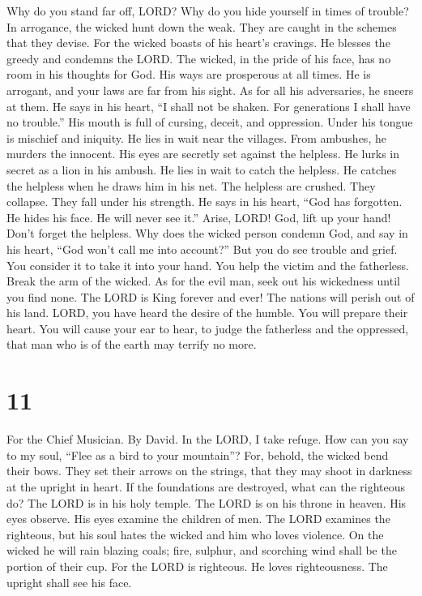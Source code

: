  Why do you stand far off, LORD? Why do you hide yourself
in times of trouble?  In arrogance, the wicked hunt down
the weak. They are caught in the schemes that they devise.
 For the wicked boasts of his heart's cravings. He blesses
the greedy and condemns the LORD.  The wicked, in the
pride of his face, has no room in his thoughts for God. 
His ways are prosperous at all times. He is arrogant, and your laws are
far from his sight. As for all his adversaries, he sneers at them.
 He says in his heart, ``I shall not be shaken. For
generations I shall have no trouble.''  His mouth is full
of cursing, deceit, and oppression. Under his tongue is mischief and
iniquity.  He lies in wait near the villages. From
ambushes, he murders the innocent. His eyes are secretly set against the
helpless.  He lurks in secret as a lion in his ambush. He
lies in wait to catch the helpless. He catches the helpless when he
draws him in his net.  The helpless are crushed. They
collapse. They fall under his strength.  He says in his
heart, ``God has forgotten. He hides his face. He will never see it.''
 Arise, LORD! God, lift up your hand! Don't forget the
helpless.  Why does the wicked person condemn God, and
say in his heart, ``God won't call me into account?'' 
But you do see trouble and grief. You consider it to take it into your
hand. You help the victim and the fatherless.  Break the
arm of the wicked. As for the evil man, seek out his wickedness until
you find none.  The LORD is King forever and ever! The
nations will perish out of his land.  LORD, you have
heard the desire of the humble. You will prepare their heart. You will
cause your ear to hear,  to judge the fatherless and the
oppressed, that man who is of the earth may terrify no more.

\hypertarget{section-10}{%
\section{11}\label{section-10}}

For the Chief Musician. By David.  In the LORD, I take
refuge. How can you say to my soul, ``Flee as a bird to your mountain''?
 For, behold, the wicked bend their bows. They set their
arrows on the strings, that they may shoot in darkness at the upright in
heart.  If the foundations are destroyed, what can the
righteous do?  The LORD is in his holy temple. The LORD is
on his throne in heaven. His eyes observe. His eyes examine the children
of men.  The LORD examines the righteous, but his soul
hates the wicked and him who loves violence.  On the
wicked he will rain blazing coals; fire, sulphur, and scorching wind
shall be the portion of their cup.  For the LORD is
righteous. He loves righteousness. The upright shall see his face.

